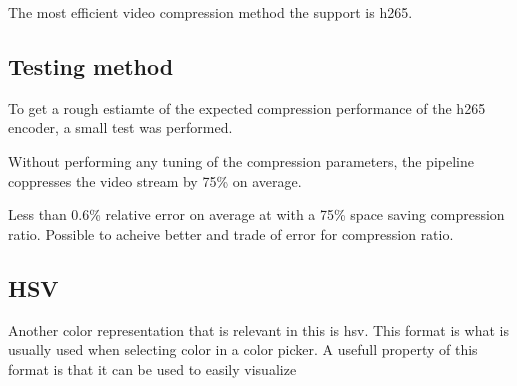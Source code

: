 The most efficient video compression method the \jx support is \gls{h265}.

\subsection{Testing method}
To get a rough estiamte of the expected compression performance of the \gls{h265} encoder, a small test was performed.






Without performing any tuning of the compression parameters, the pipeline coppresses the video stream by 75\% on average.


Less than 0.6\% relative error on average at with a 75\% space saving compression ratio.
Possible to acheive better and trade of error for compression ratio.

\subsection{HSV}
Another color representation that is relevant in this \master is \gls{hsv}.
This format is what is usually used when selecting color in a color picker.
A usefull property of this format is that it can be used to easily visualize